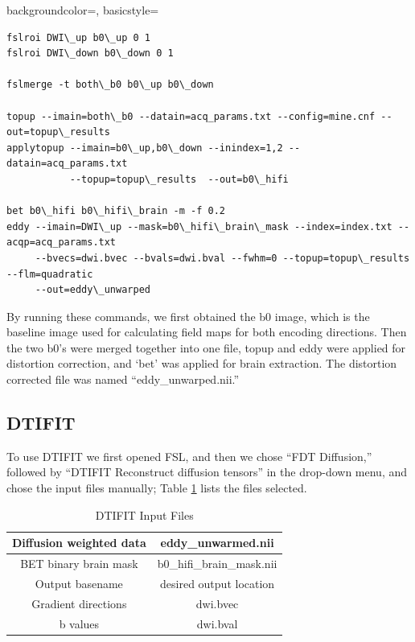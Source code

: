 {
    backgroundcolor=\color{white},
    basicstyle=\scriptsize\color{black}\ttfamily
}

\begin{lstlisting}[style=DOS]
fslroi DWI\_up b0\_up 0 1
fslroi DWI\_down b0\_down 0 1

fslmerge -t both\_b0 b0\_up b0\_down

topup --imain=both\_b0 --datain=acq_params.txt --config=mine.cnf --out=topup\_results
applytopup --imain=b0\_up,b0\_down --inindex=1,2 --datain=acq_params.txt
           --topup=topup\_results  --out=b0\_hifi

bet b0\_hifi b0\_hifi\_brain -m -f 0.2
eddy --imain=DWI\_up --mask=b0\_hifi\_brain\_mask --index=index.txt --acqp=acq_params.txt
     --bvecs=dwi.bvec --bvals=dwi.bval --fwhm=0 --topup=topup\_results --flm=quadratic
     --out=eddy\_unwarped

\end{lstlisting}

By running these commands, we first obtained the b0 image, which is the baseline image used for calculating field maps for both encoding directions. Then the two b0's were merged together into one file, topup and eddy were applied for distortion correction, and `bet' was applied for brain extraction. The distortion corrected file was named ``eddy\_unwarped.nii.''

\subsection{DTIFIT}
\label{sec:dtifit}

To use DTIFIT we first opened FSL, and then we chose ``FDT Diffusion,'' followed by ``DTIFIT Reconstruct diffusion tensors'' in the drop-down menu, and chose the input files manually; Table \ref{tab:dtifit} lists the files selected.

\begin{table}[H]
\centering
\caption{DTIFIT Input Files}
\label{tab:dtifit}
\begin{tabular}{|c|c|}
\hline
Diffusion weighted data & eddy\_unwarmed.nii        \\ \hline
BET binary brain mask   & b0\_hifi\_brain\_mask.nii \\ \hline
Output basename          & desired output location   \\ \hline
Gradient directions     & dwi.bvec                  \\ \hline
b values                & dwi.bval                  \\ \hline
\end{tabular}
\end{table}

